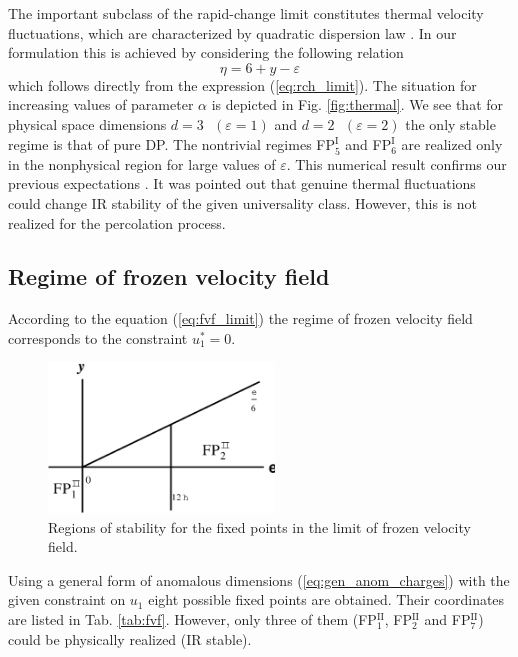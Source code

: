 \documentclass[aps,pre,url,twocolumn,superscriptaddress]{revtex4-1}
\def\eps{\varepsilon}
\newcommand{\fp}[2]{FP$^{\textrm{#1}}_{#2}$}
\begin{document}
The important subclass of the rapid-change  limit constitutes thermal velocity
fluctuations, which
are characterized by quadratic dispersion law \cite{FNS77}. In our formulation this is achieved
by considering the following relation
\begin{equation}
  \eta = 6 +y - \eps   
  \label{eq:cond_thermal}
\end{equation}
which follows directly from the expression (\ref{eq:rch_limit}).
The situation for increasing values of parameter $\alpha$ is depicted in
Fig. \ref{fig:thermal}. We see that for physical space dimensions 
$d=3\mbox{ }(\eps=1)$ and $d=2\mbox{ }(\eps=2)$ the only stable regime is that of pure DP.
The nontrivial regimes \fp{I}{5} and \fp{I}{6} are realized only in the nonphysical
region for large values of $\eps$. This numerical result confirms our
previous expectations \cite{AntKap08,AntKap10}. 
It was pointed out \cite{HH00,HHL13} that
genuine thermal fluctuations could change IR stability of the given universality class. 
However, this is not realized for the percolation process.
\subsection{Regime of frozen velocity field \label{subsec:frozen}}

According to the equation (\ref{eq:fvf_limit}) the regime of frozen
velocity field
corresponds to the constraint $u_{1}^*=0$.
\begin{figure}[h!]
  \includegraphics[width=6cm]{stab_FVF.eps}
  \caption{Regions of stability for the fixed points in the limit of frozen velocity field.}
  \label{fig:stab_fvf}
\end{figure}
 Using a general form of anomalous dimensions (\ref{eq:gen_anom_charges}) with
 the given constraint on $u_1$ eight possible fixed points are obtained.
Their coordinates are listed in Tab. \ref{tab:fvf}. However, only three
of them (\fp{II}{1}, \fp{II}{2} and \fp{II}{7}) could be physically realized (IR stable).
 
\end{document}
